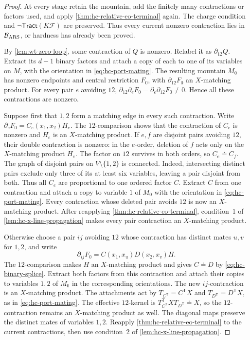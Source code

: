 \documentclass[11pt,letterpaper,onecolumn]{article}
\theoremstyle{plain}
\theoremstyle{definition}
\theoremstyle{remark}
\newcommand{\cF}{\mathcal F}
\newcommand{\Tract}{\mathsf{Tract}}
\begin{document}
	\begin{proof}
		At every stage retain the mountain, add the finitely many
		contractions or factors used, and apply \cref{thm:hc-relative-eo-terminal} again.
		The charge condition and \(\neg\Tract(K\cF)\) are preserved.
		Thus every current nonzero contraction lies in \(\mathcal B_{\rm ARS}\), or
		hardness has already been proved.
		
		By \cref{lem:wt-zero-loop}, some contraction of \(Q\) is nonzero.
		Relabel it as \(\partial_{12}Q\).
		Extract its \(d-1\) binary factors and attach a copy of each to one
		of its variables on \(M\), with the orientation in
		\eqref{eq:hc-port-mating}.
		The resulting mountain \(M_0\) has nonzero endpoints and central restriction
		\(F_0\), with \(\partial_{12}F_0\) an \(X\)-matching product.
		For every pair \(e\) avoiding \(12\),
		\(\partial_{12}\partial_eF_0=\partial_e\partial_{12}F_0\ne0\).
		Hence all these contractions are nonzero.
		
		Suppose first that \(1,2\) form a matching edge in every such contraction.
		Write \(\partial_eF_0=C_e(x_1,x_2)H_e\).
		The \(12\)-comparison shows that the contraction of \(C_e\) is nonzero
		and \(H_e\) is an \(X\)-matching product.  If \(e,f\) are disjoint pairs avoiding
		\(12\), their double contraction is nonzero: in the \(e\)-order, deletion of
		\(f\) acts only on the \(X\)-matching product \(H_e\).
		The factor on \(12\) survives in both orders, so \(C_e\doteq C_f\).
		The graph of disjoint pairs on \(V\setminus\{1,2\}\) is connected.
		Indeed, intersecting distinct pairs exclude only three of its at least
		six variables, leaving a pair disjoint from both.
		Thus all \(C_e\) are proportional to one ordered factor \(C\).
		Extract \(C\) from one contraction and attach a copy to variable \(1\) of \(M_0\)
		with the orientation in \eqref{eq:hc-port-mating}.  Every contraction whose deleted pair avoids \(12\) is now an
		\(X\)-matching product.  After reapplying
		\cref{thm:hc-relative-eo-terminal}, condition~1 of
		\cref{lem:hc-x-line-propagation} makes every pair contraction an
		\(X\)-matching product.
		
		Otherwise choose a pair \(ij\) avoiding \(12\) whose contraction has distinct
		mates \(u,v\) for \(1,2\), and write
		\[
		\partial_{ij}F_0=C(x_1,x_u)D(x_2,x_v)H.
		\]
		The \(12\)-comparison makes \(H\) an \(X\)-matching product and gives
		\(C\doteq D\) by \eqref{eq:hc-binary-splice}.
		Extract both factors from this contraction and attach their copies to variables \(1,2\) of
		\(M_0\) in the corresponding orientations.  The new \(ij\)-contraction is an \(X\)-matching product.
		The attachments act by \(T_{C^{\mathsf T}}=C^{\mathsf T}X\) and
		\(T_{D^{\mathsf T}}=D^{\mathsf T}X\), as in \eqref{eq:hc-port-mating}.  The effective
		\(12\)-kernel is \(T_{C^{\mathsf T}}^{\mathsf T}XT_{D^{\mathsf T}}\doteq X\), so the
		\(12\)-contraction remains an \(X\)-matching product as well.  The
		diagonal maps preserve the distinct mates of variables \(1,2\).  Reapply
		\cref{thm:hc-relative-eo-terminal} to the current contractions, then use condition~2 of \cref{lem:hc-x-line-propagation}.
		

\end{proof}
\end{document}
